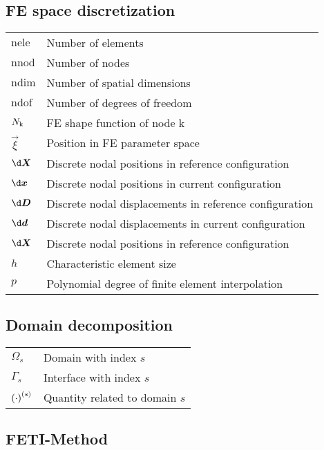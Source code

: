 \subsection*{FE space discretization}
\begin{tabular}{l l}
$\mathrm{nele}$ &Number of elements \\
$\mathrm {nnod}$ &Number of nodes \\
$\mathrm {ndim}$ &Number of spatial dimensions \\
$\mathrm {ndof}$ &Number of degrees of freedom \\
$N_\mathrm k$ &FE shape function of node k \\
$\vec{\xi}$ &Position in FE parameter space \\
$\vec{\d X}$ &Discrete nodal positions in reference configuration \\
$\vec{\d x}$ &Discrete nodal positions in current configuration \\
$\vec{\d D}$ &Discrete nodal displacements in reference configuration \\
$\vec{\d d}$ &Discrete nodal displacements in current configuration \\
$\vec{\d X}$ &Discrete nodal positions in reference configuration \\
$h$ &Characteristic element size \\
$p$ &Polynomial degree of finite element interpolation \\
\end{tabular}
%

\subsection*{Domain decomposition}
\begin{tabular}{l l}
$\Omega_s$   &Domain with index $s$ \\
$\Gamma_s$   &Interface with index $s$\\
${(\cdot)}^{(s)}$      &Quantity related to domain $s$ \\
\end{tabular}

\subsection*{FETI-Method}
